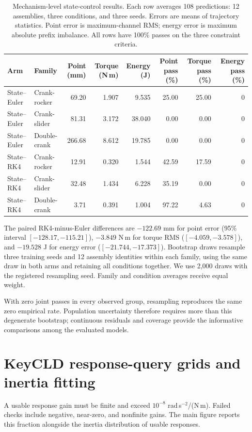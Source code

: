 \begin{table}[t]
\caption{Mechanism-level state-control results. Each row averages 108 predictions: 12 assemblies, three conditions, and three seeds. Errors are means of trajectory statistics. Point error is maximum-channel RMS; energy error is maximum absolute prefix imbalance. All rows have 100\% passes on the three constraint criteria.}
\label{app:corpus-families}
\centering\small
\begin{tabular}{llrrrrrr}
\toprule
Arm & Family & Point (mm) & Torque (N\,m) & Energy (J) & Point pass (\%) & Torque pass (\%) & Energy pass (\%)\\
\midrule
State--Euler & Crank-rocker & 69.20 & 1.907 & 9.535 & 25.00 & 25.00 & 0 \\
State--Euler & Crank-slider & 81.31 & 3.172 & 38.040 & 0.00 & 0.00 & 0 \\
State--Euler & Double-crank & 266.68 & 8.612 & 19.785 & 0.00 & 0.00 & 0 \\
State--RK4 & Crank-rocker & 12.91 & 0.320 & 1.544 & 42.59 & 17.59 & 0 \\
State--RK4 & Crank-slider & 32.48 & 1.434 & 6.228 & 35.19 & 0.00 & 0 \\
State--RK4 & Double-crank & 3.71 & 0.391 & 1.004 & 97.22 & 4.63 & 0 \\
\bottomrule
\end{tabular}
\end{table}

The paired RK4-minus-Euler differences are $-122.69$ mm for point error (95\% interval $[-128.17,-115.21]$), $-3.849$ N\,m for torque RMS ($[-4.059,-3.578]$), and $-19.528$ J for energy error ($[-21.744,-17.373]$). Bootstrap draws resample three training seeds and 12 assembly identities within each family, using the same draw in both arms and retaining all conditions together. We use 2,000 draws with the registered resampling seed. Family and condition averages receive equal weight.

With zero joint passes in every observed group, resampling reproduces the same zero empirical rate. Population uncertainty therefore requires more than this degenerate bootstrap; continuous residuals and coverage provide the informative comparisons among the evaluated models.

\section{KeyCLD response-query grids and inertia fitting}
\label{app:corpus-probes}
A usable response gain must be finite and exceed $10^{-8}$ rad\,s$^{-2}$/(N\,m). Failed checks include negative, near-zero, and nonfinite gains. The main figure reports this fraction alongside the inertia distribution of usable responses.

